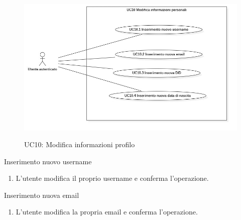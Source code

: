 \begin{figure}[!h] 
  \centering 
  \includegraphics[width=0.9\columnwidth, alt={Caso d'uso relativo alla modifica delle informazioni del profilo}]{immagini/usecase/UC10.jpg}
  \caption{UC10: Modifica informazioni profilo}\label{fig:uc:prenotazione-film}
\end{figure}

\begin{usecase}{10.1}{Inserimento nuovo username}\label{uc:modifica-username}
  \usecasemain{}
  
  \begin{enumerate}
    \item L'utente modifica il proprio username e conferma l'operazione.
  \end{enumerate}
  
\end{usecase}

\begin{usecase}{10.2}{Inserimento nuova email}\label{uc:modifica-email}
  \usecasemain{}
  
  \begin{enumerate}
    \item L'utente modifica la propria email e conferma l'operazione.
  \end{enumerate}
  
\end{usecase}

